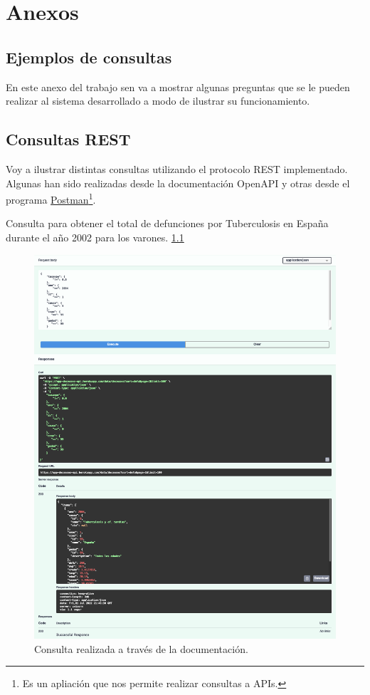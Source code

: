 \chapter{Anexos}

\section{Ejemplos de consultas} 
\label{sec:ejemplos}

En este anexo del trabajo sen va a mostrar algunas preguntas que se le pueden realizar al
sistema desarrollado a modo de ilustrar su
funcionamiento.

\section{Consultas REST}

Voy a ilustrar distintas consultas utilizando el protocolo REST implementado. Algunas han sido realizadas desde la documentación OpenAPI y otras desde el programa \href{https://www.postman.com/}{Postman}\footnote{Es un apliación que nos permite realizar consultas a APIs.}.

\vskip 0.4in

Consulta para obtener el total de defunciones
por Tuberculosis en España durante el año 2002 para los varones. \ref{fig:1}
\FloatBarrier
\begin{figure}[h]
	\centering
	\includegraphics[width=\textwidth]{doc/logos/imgs/ejemplo1.png}
	\caption{ Consulta realizada a través de la documentación. }
	\label{fig:1}
\end{figure}
\FloatBarrier

